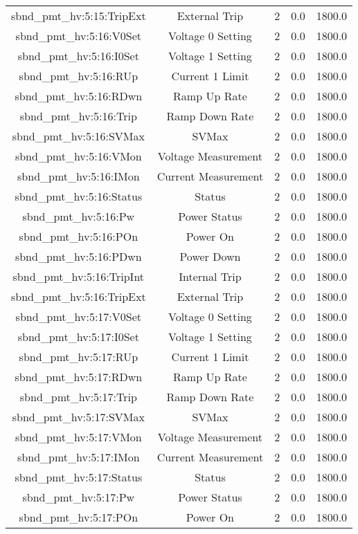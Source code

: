 \begin{center}
\begin{longtable}{c | c c c c }
sbnd\_pmt\_hv:5:15:TripExt & External Trip & 2 & 0.0 & 1800.0\\ 
sbnd\_pmt\_hv:5:16:V0Set & Voltage 0 Setting & 2 & 0.0 & 1800.0\\ 
sbnd\_pmt\_hv:5:16:I0Set & Voltage 1 Setting & 2 & 0.0 & 1800.0\\ 
sbnd\_pmt\_hv:5:16:RUp & Current 1 Limit & 2 & 0.0 & 1800.0\\ 
sbnd\_pmt\_hv:5:16:RDwn & Ramp Up Rate & 2 & 0.0 & 1800.0\\ 
sbnd\_pmt\_hv:5:16:Trip & Ramp Down Rate & 2 & 0.0 & 1800.0\\ 
sbnd\_pmt\_hv:5:16:SVMax & SVMax & 2 & 0.0 & 1800.0\\ 
sbnd\_pmt\_hv:5:16:VMon & Voltage Measurement & 2 & 0.0 & 1800.0\\ 
sbnd\_pmt\_hv:5:16:IMon & Current Measurement & 2 & 0.0 & 1800.0\\ 
sbnd\_pmt\_hv:5:16:Status & Status & 2 & 0.0 & 1800.0\\ 
sbnd\_pmt\_hv:5:16:Pw & Power Status & 2 & 0.0 & 1800.0\\ 
sbnd\_pmt\_hv:5:16:POn & Power On & 2 & 0.0 & 1800.0\\ 
sbnd\_pmt\_hv:5:16:PDwn & Power Down & 2 & 0.0 & 1800.0\\ 
sbnd\_pmt\_hv:5:16:TripInt & Internal Trip & 2 & 0.0 & 1800.0\\ 
sbnd\_pmt\_hv:5:16:TripExt & External Trip & 2 & 0.0 & 1800.0\\ 
sbnd\_pmt\_hv:5:17:V0Set & Voltage 0 Setting & 2 & 0.0 & 1800.0\\ 
sbnd\_pmt\_hv:5:17:I0Set & Voltage 1 Setting & 2 & 0.0 & 1800.0\\ 
sbnd\_pmt\_hv:5:17:RUp & Current 1 Limit & 2 & 0.0 & 1800.0\\ 
sbnd\_pmt\_hv:5:17:RDwn & Ramp Up Rate & 2 & 0.0 & 1800.0\\ 
sbnd\_pmt\_hv:5:17:Trip & Ramp Down Rate & 2 & 0.0 & 1800.0\\ 
sbnd\_pmt\_hv:5:17:SVMax & SVMax & 2 & 0.0 & 1800.0\\ 
sbnd\_pmt\_hv:5:17:VMon & Voltage Measurement & 2 & 0.0 & 1800.0\\ 
sbnd\_pmt\_hv:5:17:IMon & Current Measurement & 2 & 0.0 & 1800.0\\ 
sbnd\_pmt\_hv:5:17:Status & Status & 2 & 0.0 & 1800.0\\ 
sbnd\_pmt\_hv:5:17:Pw & Power Status & 2 & 0.0 & 1800.0\\ 
sbnd\_pmt\_hv:5:17:POn & Power On & 2 & 0.0 & 1800.0\\ 

\end{longtable}
\end{center}
